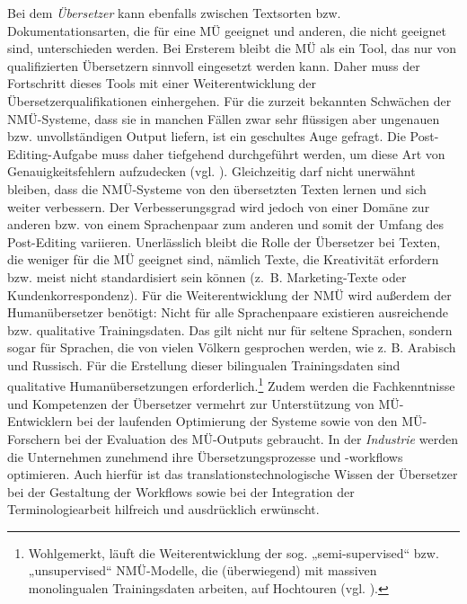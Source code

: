 Bei dem \textit{Übersetzer} kann ebenfalls zwischen Textsorten bzw. Dokumentationsarten, die für eine MÜ geeignet und anderen, die nicht geeignet sind, unterschieden werden. Bei Ersterem bleibt die MÜ als ein Tool, das nur von qualifizierten Übersetzern sinnvoll eingesetzt werden kann. Daher muss der Fortschritt dieses Tools mit einer Weiterentwicklung der Übersetzerqualifikationen einhergehen. Für die zurzeit bekannten Schwächen der NMÜ-Systeme, dass sie in manchen Fällen zwar sehr flüssigen aber ungenauen bzw. unvollständigen Output liefern, ist ein geschultes Auge gefragt. Die Post-Editing-Aufgabe muss daher tiefgehend durchgeführt werden, um diese Art von Genauigkeitsfehlern aufzudecken (vgl. \citealt{Volk2018}). Gleichzeitig darf nicht unerwähnt bleiben, dass die NMÜ-Systeme von den übersetzten Texten lernen und sich weiter verbessern. Der Verbesserungsgrad wird jedoch von einer Domäne zur anderen bzw. von einem Sprachenpaar zum anderen und somit der Umfang des Post-Editing variieren. Unerlässlich bleibt die Rolle der Übersetzer bei Texten, die weniger für die MÜ geeignet sind, nämlich Texte, die Kreativität erfordern bzw. meist nicht standardisiert sein können (z.~B. Marketing-Texte oder Kundenkorrespondenz). Für die Weiterentwicklung der NMÜ wird außerdem der Humanübersetzer benötigt: Nicht für alle Sprachenpaare existieren ausreichende bzw. qualitative Trainingsdaten. Das gilt nicht nur für seltene Sprachen, sondern sogar für Sprachen, die von vielen Völkern gesprochen werden, wie z. B. Arabisch und Russisch. Für die Erstellung dieser bilingualen Trainingsdaten sind qualitative Humanübersetzungen erforderlich.\footnote{{{{Wohlgemerkt, läuft die Weiterentwicklung der sog. „semi-supervised“ bzw. „unsupervised“ NMÜ-Modelle, die (überwiegend) mit massiven monolingualen Trainingsdaten arbeiten, auf Hochtouren (vgl. \citealt{ZhangZong2020}).}}}} Zudem werden die Fachkenntnisse und Kompetenzen der Übersetzer vermehrt zur Unterstützung von MÜ-Entwicklern bei der laufenden Optimierung der Systeme sowie von den MÜ-Forschern bei der Evaluation des MÜ-Outputs gebraucht. In der \textit{Industrie} werden die Unternehmen zunehmend ihre Übersetzungsprozesse und -workflows optimieren. Auch hierfür ist das translationstechnologische Wissen der Übersetzer bei der Gestaltung der Workflows sowie bei der Integration der Terminologiearbeit hilfreich und ausdrücklich erwünscht.

